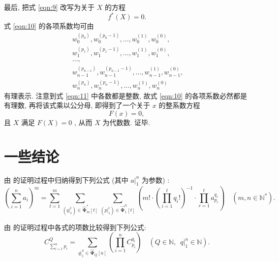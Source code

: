 \documentclass{article}
\renewcommand\.{.\hspace{3pt}}
\renewcommand\,{,\hspace{4pt}}
\renewcommand\:{:\hspace{3pt}}
\newcommand\A{,\hspace{6pt}}
\begin{document}
	最后\, 把式 \eqref{eqn:9} 改写为关于 $X$ 的方程
	\begin{equation} \label{eqn:10}
		f^{\ast} (X) = 0 \.
	\end{equation}
	式 \eqref{eqn:10} 的各项系数均可由
	\begin{equation} \label{eqn:11}
		\begin{array}{l}
		w_{0}^{\left( p_{0} \right)} , w_{0}^{\left( p_{0}-1 \right)} , \ldots , w_{0}^{\left( 1 \right)} , w_{0}^{\left( 0 \right)} , \\
		w_{1}^{\left( p_{1} \right)} , w_{1}^{\left( p_{1}-1 \right)} , \ldots , w_{1}^{\left( 1 \right)} , w_{1}^{\left( 0 \right)} , \\
		\ldots , \\
		w_{n-1}^{\left( p_{n-1} \right)} , w_{n-1}^{\left( p_{n-1}-1 \right)} , \ldots , w_{n-1}^{\left( 1 \right)} , w_{n-1}^{\left( 0 \right)} , \\
		w_{n}^{\left( p_{n} \right)} , w_{n}^{\left( p_{n}-1 \right)} , \ldots , w_{n}^{\left( 1 \right)} , w_{n}^{\left( 0 \right)}
		\end{array}
	\end{equation}
	有理表示\. 注意到式 \eqref{eqn:11} 中各数都是整数\, 故式 \eqref{eqn:10} 的各项系数必然都是有理数\, 再将该式乘以公分母\, 即得到了一个关于 $x$ 的整系数方程
	\begin{equation} \label{eqn:12}
		F(x) = 0 \,
	\end{equation}
	且 $X$ 满足 $F(X) = 0$ \, 从而 $X$ 为代数数\. 证毕\.
	
	\section{一些结论}
	 \quad 由 \underline{} 的证明过程中归纳得到下列公式 (其中 $a |_{1}^{n}$ 为参数) \:
	\begin{equation}
		\left( \sum_{i=1}^{n} a_{i} \right)^{m} = \sum_{t=1}^{m} \sum_{\left( q |_{1}^{t} \right) \in \bm{\hat{\Psi}}_m^{\bm{\ast}} \left[ t \right]} \sum_{\left( p |_{1}^{t} \right) \in \bm{\vec{\Psi}}_{1}^{n} \left[ t \right]} \left( m! \cdot \left( \prod_{i=1}^{t} q_{i}! \right)^{-1} \cdot \prod_{r=1}^{t} a_{p_{r}}^{q_{r}} \right) \quad \left( m , n \in \mathbb{N^{\ast}} \right) \.
	\end{equation}
	
	 \quad 由 \underline{} 的证明过程中各式的项数比较得到下列公式\:
	\begin{equation}
		C_{\sum_{i=1}^{n} p_{i}}^{Q} = \sum_{q |_{1}^{n} \in \bm{\hat{\Psi}}_{Q} \left[ n \right]} \left( \prod_{i=1}^{n} C_{p_{i}}^{q_{i}} \right) \quad \left( Q \in \mathbb{N} \A q |_{1}^{n} \in \mathbb{N} \right) \.
	\end{equation}
	
\end{document}
